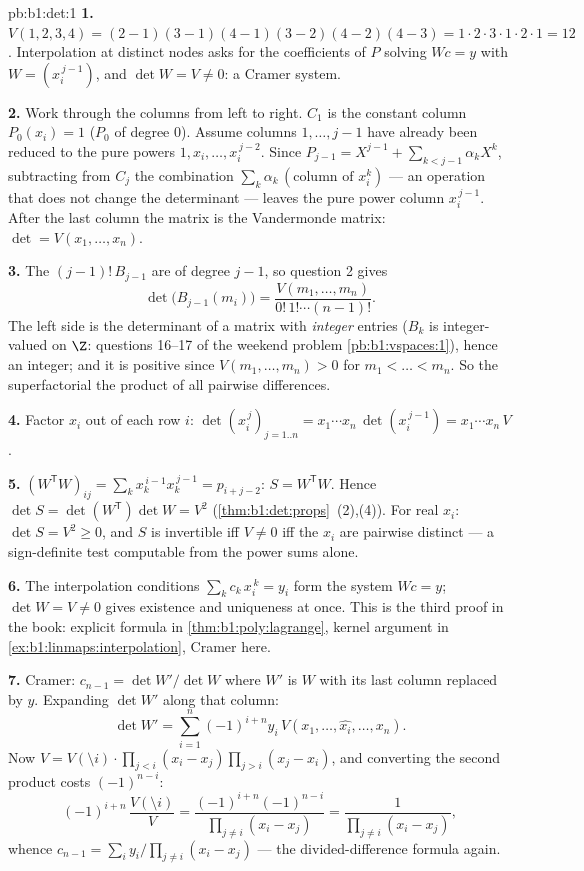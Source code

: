 \begin{solution}{pb:b1:det:1}
\textbf{1.} $V(1,2,3,4) = (2-1)(3-1)(4-1)(3-2)(4-2)(4-3) = 1
\cdot 2\cdot 3\cdot 1\cdot 2\cdot 1 = 12$. Interpolation at
distinct nodes asks for the coefficients of $P$ solving $W c =
y$ with $W = (x_i^{\,j-1})$, and $\det W = V \neq 0$: a Cramer
system.

\textbf{2.} Work through the columns from left to right. $C_1$
is the constant column $P_0(x_i) = 1$ ($P_0$  of degree
$0$). Assume columns $1, \dots, j-1$ have already been reduced
to the pure powers $1, x_i, \dots, x_i^{\,j-2}$. Since $P_{j-1}
= X^{j-1} + \sum_{k < j-1}\alpha_k X^k$, subtracting from $C_j$
the combination $\sum_k \alpha_k\,(\text{column of } x_i^k)$
--- an operation that does not change the determinant --- leaves
the pure power column $x_i^{\,j-1}$. After the last column the
matrix is the Vandermonde matrix: $\det = V(x_1, \dots, x_n)$.

\textbf{3.} The  $(j-1)!\,B_{j-1}$ are  of
degree $j - 1$, so question 2 gives
\[
\det\bigl(B_{j-1}(m_i)\bigr)
= \frac{V(m_1, \dots, m_n)}{0!\,1!\cdots(n-1)!} .
\]
The left side is the determinant of a matrix with \emph{integer}
entries ($B_k$ is integer-valued on $\Z$: questions 16--17 of
the weekend problem \cref{pb:b1:vspaces:1}), hence an integer;
and it is positive since $V(m_1, \dots, m_n) > 0$ for $m_1 <
\dots < m_n$. So the superfactorial  the product of all
pairwise differences.

\textbf{4.} Factor $x_i$ out of each row $i$:
$\det(x_i^{\,j})_{j = 1..n} = x_1\cdots x_n\,
\det(x_i^{\,j-1}) = x_1\cdots x_n\,V$.

\textbf{5.} $(W^{\mathsf T}W)_{ij} = \sum_k x_k^{\,i-1}
x_k^{\,j-1} = p_{i+j-2}$: $S = W^{\mathsf T}W$. Hence $\det S =
\det(W^{\mathsf T})\det W = V^2$
(\cref{thm:b1:det:props}~(2),(4)). For real $x_i$: $\det S = V^2
\geq 0$, and $S$ is invertible iff $V \neq 0$ iff the $x_i$ are
pairwise distinct --- a sign-definite test computable from the
power sums alone.

\textbf{6.} The interpolation conditions $\sum_{k}
c_k\,x_i^{\,k} = y_i$ form the system $Wc = y$; $\det W = V \neq
0$ gives existence and uniqueness at once. This is the third
proof in the book: explicit formula in
\cref{thm:b1:poly:lagrange}, kernel argument in
\cref{ex:b1:linmaps:interpolation}, Cramer here.

\textbf{7.} Cramer: $c_{n-1} = \det W'/\det W$ where $W'$ is $W$
with its last column replaced by $y$. Expanding $\det W'$ along
that column:
\[
\det W' = \sum_{i=1}^n (-1)^{i+n} y_i\,V(x_1, \dots, \widehat{x_i},
\dots, x_n) .
\]
Now $V = V(\setminus i)\cdot\prod_{j<i}(x_i - x_j)\prod_{j>i}
(x_j - x_i)$, and converting the second product costs
$(-1)^{n-i}$:
\[
(-1)^{i+n}\,\frac{V(\setminus i)}{V}
= \frac{(-1)^{i+n}(-1)^{n-i}}{\prod_{j\neq i}(x_i - x_j)}
= \frac{1}{\prod_{j\neq i}(x_i - x_j)} ,
\]
whence $c_{n-1} = \sum_i y_i/\prod_{j \neq i}(x_i - x_j)$ ---
the divided-difference formula again.


\end{solution}
